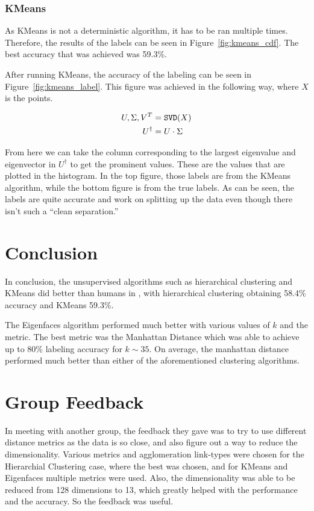 \documentclass{article}
\begin{document}
\subsubsection*{KMeans}

As KMeans is not a deterministic algorithm, it has to be ran multiple times. Therefore, the results of the labels can be seen in Figure~\ref{fig:kmeans_cdf}. The best accuracy that was achieved was 59.3\%. 

After running KMeans, the accuracy of the labeling can be seen in Figure~\ref{fig:kmeans_label}. This figure was achieved in the following way, where $X$ is the points.

\begin{align*}
  U, \Sigma, V^{T} &= {\tt SVD}(X)\\
  U^{\dagger} &= U\cdot \Sigma
\end{align*}

From here we can take the column corresponding to the largest eigenvalue and eigenvector in $U^{\dagger}$ to get the prominent values. These are the values that are plotted in the histogram. In the top figure, those labels are from the KMeans algorithm, while the bottom figure is from the true labels. As can be seen, the labels are quite accurate and work on splitting up the data even though there isn't such a ``clean separation.''

\section*{Conclusion}

In conclusion, the unsupervised algorithms such as hierarchical clustering and KMeans did better than humans in \cite{MormonID}, with hierarchical clustering obtaining 58.4\% accuracy and KMeans 59.3\%. 

The Eigenfaces algorithm performed much better with various values of $k$ and the metric. The best metric was the Manhattan Distance which was able to achieve up to 80\% labeling accuracy for $k \sim 35$. On average, the manhattan distance performed much better than either of the aforementioned clustering algorithms. 

\section*{Group Feedback}

In meeting with another group, the feedback they gave was to try to use different distance metrics as the data is so close, and also figure out a way to reduce the dimensionality. Various metrics and agglomeration link-types were chosen for the Hierarchial Clustering case, where the best was chosen, and for KMeans and Eigenfaces multiple metrics were used. Also, the dimensionality was able to be reduced from 128 dimensions to 13, which greatly helped with the performance and the accuracy. So the feedback was useful.
\end{document}
